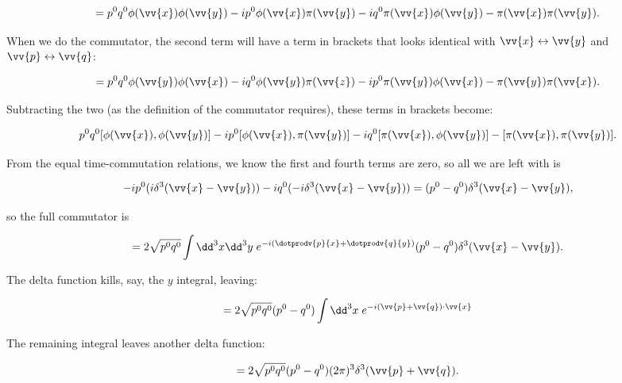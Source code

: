 \begin{align*}
    = p^0q^0 \phi(\vv{x})\phi(\vv{y}) - ip^0\phi(\vv{x})\pi(\vv{y}) - iq^0\pi(\vv{x})\phi(\vv{y}) - \pi(\vv{x})\pi(\vv{y}).
\end{align*}

When we do the commutator, the second term will have a term in brackets that looks identical with $\vv{x} \leftrightarrow \vv{y}$ and $\vv{p} \leftrightarrow \vv{q}$:

\begin{equation*}
    = p^0q^0 \phi(\vv{y})\phi(\vv{x}) - iq^0\phi(\vv{y})\pi(\vv{z}) - ip^0\pi(\vv{y})\phi(\vv{x}) - \pi(\vv{y})\pi(\vv{x}).
\end{equation*}

Subtracting the two (as the definition of the commutator requires), these terms in brackets become:

\begin{equation*}
    p^0q^0 [\phi(\vv{x}),\phi(\vv{y})] - ip^0[\phi(\vv{x}),\pi(\vv{y})] - iq^0[\pi(\vv{x}),\phi(\vv{y})] - [\pi(\vv{x}),\pi(\vv{y})].
\end{equation*}

From the equal time-commutation relations, we know the first and fourth terms are zero, so all we are left with is

\begin{equation*}
    -ip^0(i\delta^3(\vv{x}-\vv{y})) - iq^0(-i\delta^3(\vv{x}-\vv{y})) = (p^0-q^0)\delta^3(\vv{x}-\vv{y}),
\end{equation*}

so the full commutator is

\begin{equation*}
    [a^{\dagger}(\vv{p}),a^{\dagger}(\vv{q})] = 2\sqrt{p^0q^0} \int \dd^3x\dd^3y \; e^{-i(\dotprodv{p}{x}+\dotprodv{q}{y})} (p^0-q^0)\delta^3(\vv{x}-\vv{y}).
\end{equation*}

The delta function kills, say, the $y$ integral, leaving:

\begin{equation*}
    [a^{\dagger}(\vv{p}),a^{\dagger}(\vv{q})] = 2\sqrt{p^0q^0}(p^0-q^0) \int \dd^3x \; e^{-i(\vv{p}+\vv{q})\cdot\vv{x}} 
\end{equation*}

The remaining integral leaves another delta function:

\begin{equation*}
    [a^{\dagger}(\vv{p}),a^{\dagger}(\vv{q})] = 2\sqrt{p^0q^0}(p^0-q^0) (2\pi)^3 \delta^3(\vv{p}+\vv{q}).
\end{equation*}

